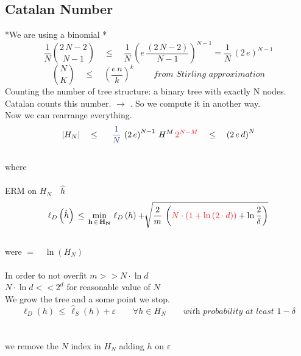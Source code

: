\documentclass[../main.tex]{subfiles}
\begin{document}
\subsection{Catalan Number}
*We are using a binomial *
$$
\frac{1}{N} \binom{2 \, N -2}{N-1} \quad \leq \quad \frac{1}{N} \, \left(e \, \frac{\left(2\, N -2 \right)}{N-1} \right)^{N-1} = \frac{1}{N} \, \left( 2 \, e \right)^{N-1}
$$
$$
\binom{N}{K} \quad \leq \quad \left( \frac{e\, n}{k}\right)^k \qquad \textit{ from Stirling approximation}
$$
Counting the number of tree structure: a binary tree with exactly N nodes.
Catalan counts this number. $\longrightarrow$ . So we compute it in another way.
\\
Now we can rearrange everything.
\\
$$ | H _N | 
\quad \leq \quad  \blue{ $
\frac{1}{N}$} \, \left( 2 \, e \right)^{N-1} \, H^M \, \bred{$2^{N-M} $}
\quad  \leq \quad 
\left( 2 \, e \, d \right)^N
$$
\qquad \qquad \qquad \qquad \qquad \qquad \qquad 
{} \qquad {}\\
where 
\\\\
ERM on $H_N \quad \hat{h} \quad $ 
$$\ell_D \left(\hat{h}\right) \, \leq \, \min_{\mathbf{h \, \in\, H_N}} \, \ell_D \left( h \right) + \sqrt[]{\frac{2}{m} \,  \left( \bred{$   N \cdot \left( 1+ \ln \left(2 \cdot d \right) \right)$} + \ln \frac{2}{\delta} \right) }
$$
\\
were    \quad $= \quad  \ln \left( H_N \right) 
$\\\\
In order to not overfit $ m >> N \cdot \ln d
$\\
$N \cdot \ln d << 2^d$ for reasonable value of $N$
\\
We grow the tree and a some point we stop.
$$
\ell_D\left(h\right) \, \leq \, \hat{\ell}_S \left(h\right) + \varepsilon 
\qquad \forall h \in H_N \qquad \textit{with probability at least $1-\delta$}
$$
\\
\\
we remove the $N$ index in $H_N$ adding $h$ on $\varepsilon$
\end{document}
